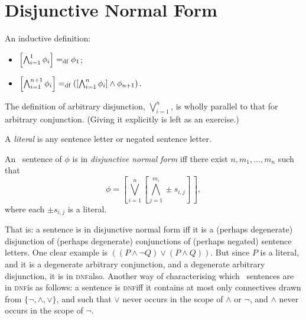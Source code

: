 
\section{Disjunctive Normal Form}

\begin{definition} An inductive definition: \begin{itemize}
	\item $\left[\bigwedge_{i=1}^{1} \phi_{i}\right] =_{\text{df}} \phi_{1}$;
	 \item $\left[\bigwedge_{i=1}^{n+1}\phi_{i}\right]=_{\text{df}} \left(\left[\bigwedge_{i=1}^{n} \phi_{i}\right]\wedge \phi_{n+1}\right).$
\end{itemize} 
\end{definition} The definition of arbitrary disjunction, $\bigvee_{i=1}^{n}$, is wholly parallel to that for arbitrary conjunction. (Giving it explicitly is left as an exercise.) \begin{definition}[Literal]
	A \emph{literal} is any sentence letter or negated sentence letter. 
\end{definition}
\begin{definition}
	An \lone\ sentence of $\phi$ is in \emph{disjunctive normal form} iff there exist $n,m_{1},\ldots,m_{n}$ such that\[\phi = \left[\bigvee_{i=1}^{n}\left[\bigwedge_{j=1}^{m_{i}} \pm s_{i,j}\right]\,\right],\]where each $\pm s_{i,j}$ is a literal.
\end{definition} That is: a sentence is in disjunctive normal form iff it is a (perhaps degenerate) disjunction of (perhaps degenerate) conjunctions of (perhaps negated) sentence letters. One clear example is $((P\wedge \neg Q) \vee (P \wedge Q))$. But since $P$ is a literal, and it is a degenerate arbitrary conjunction, and a degenerate arbitrary disjunction, it is in \textsc{\lowercase{DNF}}also. Another way of characterising which \lone\ sentences are in \textsc{\lowercase{DNF}}is as follows: a sentence is \textsc{\lowercase{DNF}}iff it contains at most only connectives drawn from $\{\neg,\wedge,\vee\}$, and such that $\vee$ never occurs in the scope of $\wedge$ or $\neg$, and $\wedge$ never occurs in the scope of $\neg$.


